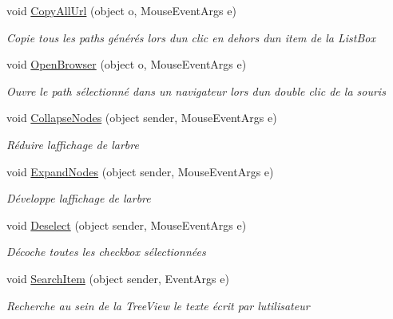 \begin{DoxyCompactItemize}
void \mbox{\hyperlink{class_m_t_connect_agent_1_1_user_control_display_tab_ac473c5026d9d7af94210c53170be841b}{Copy\+All\+Url}} (object o, Mouse\+Event\+Args e)
\begin{DoxyCompactList}\small\item\em Copie tous les paths générés lors d\textquotesingle{}un clic en dehors d\textquotesingle{}un item de la List\+Box \end{DoxyCompactList}\item 
void \mbox{\hyperlink{class_m_t_connect_agent_1_1_user_control_display_tab_a35c3095a47ee602da98eca8e77e6ff3b}{Open\+Browser}} (object o, Mouse\+Event\+Args e)
\begin{DoxyCompactList}\small\item\em Ouvre le path sélectionné dans un navigateur lors d\textquotesingle{}un double clic de la souris \end{DoxyCompactList}\item 
void \mbox{\hyperlink{class_m_t_connect_agent_1_1_user_control_display_tab_a9e5f7105041510bae0e1da721a7bc4c3}{Collapse\+Nodes}} (object sender, Mouse\+Event\+Args e)
\begin{DoxyCompactList}\small\item\em Réduire l\textquotesingle{}affichage de l\textquotesingle{}arbre \end{DoxyCompactList}\item 
void \mbox{\hyperlink{class_m_t_connect_agent_1_1_user_control_display_tab_a3b3bc198b2518ec65b3b2dba371d6f83}{Expand\+Nodes}} (object sender, Mouse\+Event\+Args e)
\begin{DoxyCompactList}\small\item\em Développe l\textquotesingle{}affichage de l\textquotesingle{}arbre \end{DoxyCompactList}\item 
void \mbox{\hyperlink{class_m_t_connect_agent_1_1_user_control_display_tab_a1913b7cb8611c0670e08abaf6e20352d}{Deselect}} (object sender, Mouse\+Event\+Args e)
\begin{DoxyCompactList}\small\item\em Décoche toutes les checkbox sélectionnées \end{DoxyCompactList}\item 
void \mbox{\hyperlink{class_m_t_connect_agent_1_1_user_control_display_tab_a9645609103b3c419c143c6f0becad308}{Search\+Item}} (object sender, Event\+Args e)
\begin{DoxyCompactList}\small\item\em Recherche au sein de la Tree\+View le texte écrit par l\textquotesingle{}utilisateur \end{DoxyCompactList}\item 

\end{DoxyCompactItemize}
